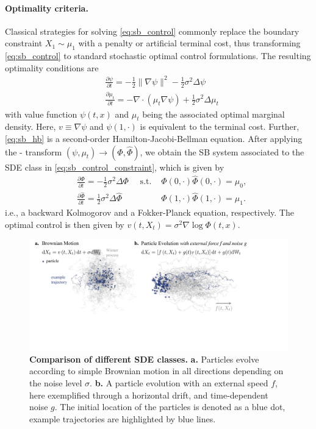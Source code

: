 \paragraph{Optimality criteria.}
Classical strategies for solving \eqref{eq:sb_control} commonly replace the boundary constraint $X_1 \sim \mu_1$ with a penalty or artificial terminal cost, thus transforming \eqref{eq:sb_control} to standard stochastic optimal control formulations. 
The resulting optimality conditions are
\begin{align}
\label{eq:sb_hb} & \frac{\partial \psi}{\partial t} = -\frac{1}{2}\|\nabla \psi\|^2 -\frac{1}{2}\sigma^2 \Delta \psi \\
\label{eq:sb_optimality}
& \frac{\partial \mu_t}{\partial t} = - \nabla \cdot(\mu_t \nabla \psi) +\frac{1}{2}\sigma^2 \Delta \mu_t
\end{align}
with value function $\psi(t, x)$ and $\mu_t$ being the associated optimal marginal density. Here, $v \equiv \nabla \psi$ and $\psi(1, \cdot)$ is equivalent to the terminal cost. Further, \cref{eq:sb_hb} is a second-order Hamilton-Jacobi-Bellman equation.
After applying the \citeauthor{hopf1950partial}-\citeauthor{cole1951quasi} transform $(\psi, \mu_t) \rightarrow (\Phi, \widehat{\Phi})$, we obtain the \acrshort{SB} system associated to the SDE class in \eqref{eq:sb_control_constraint}, which is given by
\begin{align}
& \frac{\partial \Phi}{\partial t}=-\frac{1}{2}\sigma^2 \Delta \Phi 
\quad \text { s.t. } & \Phi(0, \cdot) \widehat{\Phi}(0, \cdot)=\mu_0, \\ \nonumber
& \frac{\partial \widehat{\Phi}}{\partial t}=\frac{1}{2}\sigma^2 \Delta \widehat{\Phi} \quad & \Phi(1, \cdot) \widehat{\Phi}(1, \cdot)=\mu_1.
\end{align}
i.e., a backward Kolmogorov and a Fokker-Planck equation, respectively. The optimal control is then given by $
v(t, X_t)=\sigma^2 \nabla \log \Phi(t, x)$.

\begin{figure}[t]
  \includegraphics[width=\textwidth]{figures/fig_comparison_sdes.pdf}
  \caption{\textbf{Comparison of different SDE classes.} \textbf{a.} Particles evolve according to simple Brownian motion in all directions depending on the noise level $\sigma$. \textbf{b.} A particle evolution with an external speed $f$, here exemplified through a horizontal drift, and time-dependent noise $g$. The initial location of the particles is denoted as a blue dot, example trajectories are highlighted by blue lines.}	
  \label{fig:sde_comparison}
\end{figure}

